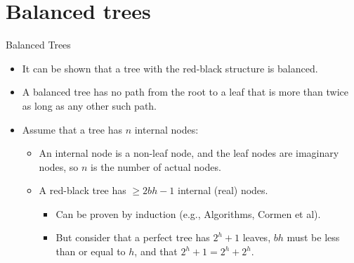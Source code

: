 \documentclass{beamer}
\begin{document}
\section*{Balanced trees}
\begin{frame}{Balanced Trees}

\begin{itemize}
    \item It can be shown that a tree with the red-black structure is balanced.
    \item A balanced tree has no path from the root to a leaf that is more than twice as long as any other such path.
    \item Assume that a tree has \( n \) internal nodes:
    \begin{itemize}
        \item An internal node is a non-leaf node, and the leaf nodes are imaginary nodes, so \( n \) is the number of actual nodes.
        \item A red-black tree has \(\geq 2bh - 1\) internal (real) nodes.
        \begin{itemize}
        
        \item Can be proven by induction (e.g., Algorithms, Cormen et al).
        \item But consider that a perfect tree has \(2^h+1\) leaves, \(bh\) must be less than or equal to \(h\), and that \(2^h+1 = 2^h + 2^h\).
        \end{itemize}
    \end{itemize}
\end{itemize}

  
\end{frame}


\end{document}
